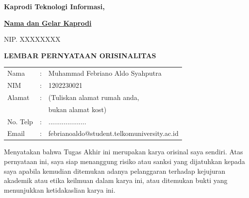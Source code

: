 \documentclass[11pt, a4paper]{article}
\begin{document}
\begin{center}
    \vspace{1.0cm}
    \textbf{Kaprodi Teknologi Informasi,}\par
    \vspace{2.2cm}
    \underline{\textbf{Nama dan Gelar Kaprodi}}\par
    NIP. XXXXXXXX
\end{center}

\newpage
{}
\begin{center}
    {\large \textbf{LEMBAR PERNYATAAN ORISINALITAS}\par}
\end{center}
\vspace{0.8cm}

\noindent
\begin{minipage}[t]{0.30\textwidth}
    \centering
    \setlength{\fboxsep}{0pt}
\end{minipage}%
\hfill
\begin{minipage}[t]{0.68\textwidth}
    \vspace{0.1cm}
    \begin{tabular}{@{}llp{6.4cm}@{}}
    Nama & : & Muhammad Febriano Aldo Syahputra \\ [0.35cm]
    NIM & : & 1202230021 \\ [0.35cm]
    Alamat & : & \textcolor{blue!80!black}{(Tuliskan alamat rumah anda,} \\
           &   & \textcolor{blue!80!black}{bukan alamat kost)} \\ [0.35cm]
    No. Telp & : & .................... \\ [0.35cm]
    Email & : & \raggedright febrianoaldo@student.telkomuniversity.ac.id \\
    \end{tabular}
\end{minipage}

\vspace{1.5cm}
\noindent
Menyatakan bahwa Tugas Akhir ini merupakan karya orisinal saya sendiri. Atas pernyataan ini, saya siap menanggung risiko atau sanksi yang dijatuhkan kepada saya apabila kemudian ditemukan adanya pelanggaran terhadap kejujuran akademik atau etika keilmuan dalam karya ini, atau ditemukan bukti yang menunjukkan ketidakaslian karya ini.
\end{document}
